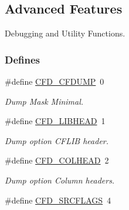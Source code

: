 \hypertarget{group__advanced__features}{\subsection{Advanced Features}
\label{group__advanced__features}
}


Debugging and Utility Functions.  


\subsubsection*{Defines}
\begin{DoxyCompactItemize}
\item 
\hypertarget{group__advanced__features_gab28b8410738c00c62003a5f5b2b19827}{\#define \hyperlink{group__advanced__features_gab28b8410738c00c62003a5f5b2b19827}{C\-F\-D\-\_\-\-C\-F\-D\-U\-M\-P}~0}\label{group__advanced__features_gab28b8410738c00c62003a5f5b2b19827}

\begin{DoxyCompactList}\small\item\em Dump Mask Minimal. \end{DoxyCompactList}\item 
\hypertarget{group__advanced__features_ga6a97e565629fc3e7423e4feb804eb5d0}{\#define \hyperlink{group__advanced__features_ga6a97e565629fc3e7423e4feb804eb5d0}{C\-F\-D\-\_\-\-L\-I\-B\-H\-E\-A\-D}~1}\label{group__advanced__features_ga6a97e565629fc3e7423e4feb804eb5d0}

\begin{DoxyCompactList}\small\item\em Dump option C\-F\-L\-I\-B header. \end{DoxyCompactList}\item 
\hypertarget{group__advanced__features_ga05403834c7c6377bcf762d640c0d0854}{\#define \hyperlink{group__advanced__features_ga05403834c7c6377bcf762d640c0d0854}{C\-F\-D\-\_\-\-C\-O\-L\-H\-E\-A\-D}~2}\label{group__advanced__features_ga05403834c7c6377bcf762d640c0d0854}

\begin{DoxyCompactList}\small\item\em Dump option Column headers. \end{DoxyCompactList}\item 
\hypertarget{group__advanced__features_ga9deeb100c2dc701f8f8193b8fb53fbff}{\#define \hyperlink{group__advanced__features_ga9deeb100c2dc701f8f8193b8fb53fbff}{C\-F\-D\-\_\-\-S\-R\-C\-F\-L\-A\-G\-S}~4}\label{group__advanced__features_ga9deeb100c2dc701f8f8193b8fb53fbff}


\end{DoxyCompactItemize}
